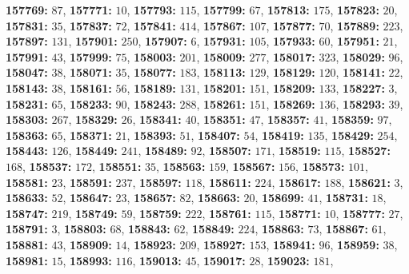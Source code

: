 \textsf{\bfseries 157769:} $87$, \textsf{\bfseries 157771:} $10$, \textsf{\bfseries 157793:} $115$, \textsf{\bfseries 157799:} $67$, \textsf{\bfseries 157813:} $175$, \textsf{\bfseries 157823:} $20$, \textsf{\bfseries 157831:} $35$, \textsf{\bfseries 157837:} $72$, \textsf{\bfseries 157841:} $414$, \textsf{\bfseries 157867:} $107$, \textsf{\bfseries 157877:} $70$, \textsf{\bfseries 157889:} $223$, \textsf{\bfseries 157897:} $131$, \textsf{\bfseries 157901:} $250$, \textsf{\bfseries 157907:} $6$, \textsf{\bfseries 157931:} $105$, \textsf{\bfseries 157933:} $60$, \textsf{\bfseries 157951:} $21$, \textsf{\bfseries 157991:} $43$, \textsf{\bfseries 157999:} $75$, \textsf{\bfseries 158003:} $201$, \textsf{\bfseries 158009:} $277$, \textsf{\bfseries 158017:} $323$, \textsf{\bfseries 158029:} $96$, \textsf{\bfseries 158047:} $38$, \textsf{\bfseries 158071:} $35$, \textsf{\bfseries 158077:} $183$, \textsf{\bfseries 158113:} $129$, \textsf{\bfseries 158129:} $120$, \textsf{\bfseries 158141:} $22$, \textsf{\bfseries 158143:} $38$, \textsf{\bfseries 158161:} $56$, \textsf{\bfseries 158189:} $131$, \textsf{\bfseries 158201:} $151$, \textsf{\bfseries 158209:} $133$, \textsf{\bfseries 158227:} $3$, \textsf{\bfseries 158231:} $65$, \textsf{\bfseries 158233:} $90$, \textsf{\bfseries 158243:} $288$, \textsf{\bfseries 158261:} $151$, \textsf{\bfseries 158269:} $136$, \textsf{\bfseries 158293:} $39$, \textsf{\bfseries 158303:} $267$, \textsf{\bfseries 158329:} $26$, \textsf{\bfseries 158341:} $40$, \textsf{\bfseries 158351:} $47$, \textsf{\bfseries 158357:} $41$, \textsf{\bfseries 158359:} $97$, \textsf{\bfseries 158363:} $65$, \textsf{\bfseries 158371:} $21$, \textsf{\bfseries 158393:} $51$, \textsf{\bfseries 158407:} $54$, \textsf{\bfseries 158419:} $135$, \textsf{\bfseries 158429:} $254$, \textsf{\bfseries 158443:} $126$, \textsf{\bfseries 158449:} $241$, \textsf{\bfseries 158489:} $92$, \textsf{\bfseries 158507:} $171$, \textsf{\bfseries 158519:} $115$, \textsf{\bfseries 158527:} $168$, \textsf{\bfseries 158537:} $172$, \textsf{\bfseries 158551:} $35$, \textsf{\bfseries 158563:} $159$, \textsf{\bfseries 158567:} $156$, \textsf{\bfseries 158573:} $101$, \textsf{\bfseries 158581:} $23$, \textsf{\bfseries 158591:} $237$, \textsf{\bfseries 158597:} $118$, \textsf{\bfseries 158611:} $224$, \textsf{\bfseries 158617:} $188$, \textsf{\bfseries 158621:} $3$, \textsf{\bfseries 158633:} $52$, \textsf{\bfseries 158647:} $23$, \textsf{\bfseries 158657:} $82$, \textsf{\bfseries 158663:} $20$, \textsf{\bfseries 158699:} $41$, \textsf{\bfseries 158731:} $18$, \textsf{\bfseries 158747:} $219$, \textsf{\bfseries 158749:} $59$, \textsf{\bfseries 158759:} $222$, \textsf{\bfseries 158761:} $115$, \textsf{\bfseries 158771:} $10$, \textsf{\bfseries 158777:} $27$, \textsf{\bfseries 158791:} $3$, \textsf{\bfseries 158803:} $68$, \textsf{\bfseries 158843:} $62$, \textsf{\bfseries 158849:} $224$, \textsf{\bfseries 158863:} $73$, \textsf{\bfseries 158867:} $61$, \textsf{\bfseries 158881:} $43$, \textsf{\bfseries 158909:} $14$, \textsf{\bfseries 158923:} $209$, \textsf{\bfseries 158927:} $153$, \textsf{\bfseries 158941:} $96$, \textsf{\bfseries 158959:} $38$, \textsf{\bfseries 158981:} $15$, \textsf{\bfseries 158993:} $116$, \textsf{\bfseries 159013:} $45$, \textsf{\bfseries 159017:} $28$, \textsf{\bfseries 159023:} $181$, 
